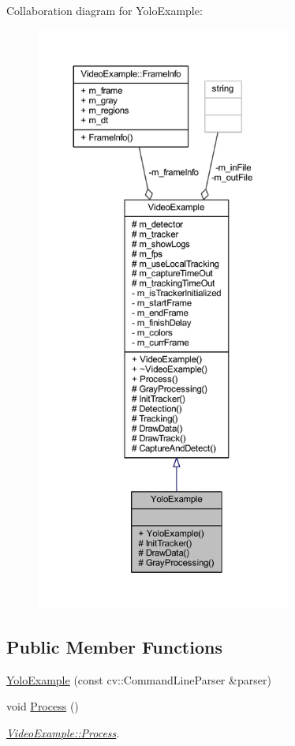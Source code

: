 Collaboration diagram for Yolo\+Example\+:\nopagebreak
\begin{figure}[H]
\begin{center}
\leavevmode
\includegraphics[height=550pt]{class_yolo_example__coll__graph}
\end{center}
\end{figure}
\subsection*{Public Member Functions}
\begin{DoxyCompactItemize}
\item 
\mbox{\hyperlink{class_yolo_example_a367f6ec19a676918f05a78706d3d664d}{Yolo\+Example}} (const cv\+::\+Command\+Line\+Parser \&parser)
\item 
void \mbox{\hyperlink{class_video_example_a87efc66a82c36ad3380623d30a12abf2}{Process}} ()
\begin{DoxyCompactList}\small\item\em \mbox{\hyperlink{class_video_example_a87efc66a82c36ad3380623d30a12abf2}{Video\+Example\+::\+Process}}. \end{DoxyCompactList}\end{DoxyCompactItemize}
